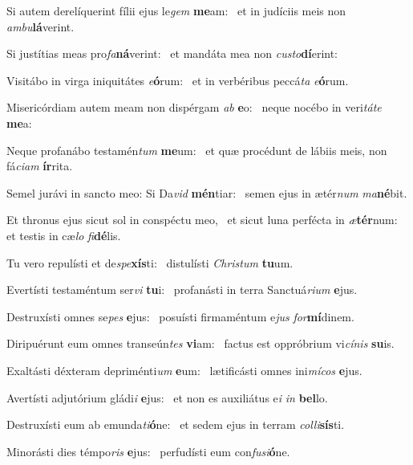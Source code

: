 \item Si autem derelíquerint fílii ejus le\textit{gem} \textbf{me}am:~\psstar{} et in judíciis meis non \textit{am}\textit{bu}\textbf{lá}verint.
\item Si justítias meas pro\textit{fa}\textbf{ná}verint:~\psstar{} et mandáta mea non \textit{cus}\textit{to}\textbf{dí}erint:
\item Visitábo in virga iniquitátes \textit{e}\textbf{ó}rum:~\psstar{} et in verbéribus peccá\textit{ta} \textit{e}\textbf{ó}rum.
\item Misericórdiam autem meam non dispérgam \textit{ab} \textbf{e}o:~\psstar{} neque nocébo in veri\textit{tá}\textit{te} \textbf{me}a:
\item Neque profanábo testamén\textit{tum} \textbf{me}um:~\psstar{} et quæ procédunt de lábiis meis, non fá\textit{ci}\textit{am} \textbf{ír}rita.
\item Semel jurávi in sancto meo: Si Da\textit{vid} \textbf{mén}tiar:~\psstar{} semen ejus in ætér\textit{num} \textit{ma}\textbf{né}bit.
\item Et thronus ejus sicut sol in conspéctu meo,~\pscross{} et sicut luna perfécta in \textit{æ}\textbf{tér}num:~\psstar{} et testis in cæ\textit{lo} \textit{fi}\textbf{dé}lis.
\item Tu vero repulísti et de\textit{spe}\textbf{xís}ti:~\psstar{} distulísti \textit{Chris}\textit{tum} \textbf{tu}um.
\item Evertísti testaméntum ser\textit{vi} \textbf{tu}i:~\psstar{} profanásti in terra Sanctuá\textit{ri}\textit{um} \textbf{e}jus.
\item Destruxísti omnes se\textit{pes} \textbf{e}jus:~\psstar{} posuísti firmaméntum e\textit{jus} \textit{for}\textbf{mí}dinem.
\item Diripuérunt eum omnes transeún\textit{tes} \textbf{vi}am:~\psstar{} factus est oppróbrium vi\textit{cí}\textit{nis} \textbf{su}is.
\item Exaltásti déxteram depriménti\textit{um} \textbf{e}um:~\psstar{} lætificásti omnes ini\textit{mí}\textit{cos} \textbf{e}jus.
\item Avertísti adjutórium gládi\textit{i} \textbf{e}jus:~\psstar{} et non es auxiliátus e\textit{i} \textit{in} \textbf{bel}lo.
\item Destruxísti eum ab emunda\textit{ti}\textbf{ó}ne:~\psstar{} et sedem ejus in terram \textit{col}\textit{li}\textbf{sís}ti.
\item Minorásti dies témpo\textit{ris} \textbf{e}jus:~\psstar{} perfudísti eum con\textit{fu}\textit{si}\textbf{ó}ne.
